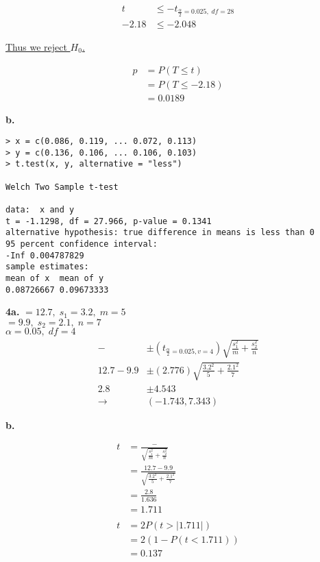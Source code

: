 \documentclass[12pt]{report}
\makeatletter
\newcommand*{\Xbar}{}%
\DeclareRobustCommand*{\Xbar}{%
	\mathpalette\@Xbar{}%
}
\newcommand*{\@Xbar}[2]{%
	\sbox0{$#1\mathrm{X}\m@th$}%
	\sbox2{$#1X\m@th$}%
	\rlap{%
		\hbox to\wd2{%
			\hfill
			$\overline{%
				\vrule width 0pt height\ht0 %
				\kern\wd0 %
			}$%
		}%
	}%
	\copy2 %
}
\newcommand*{\Ybar}{}%
\DeclareRobustCommand*{\Ybar}{%
	\mathpalette\@Ybar{}%
}
\newcommand*{\@Ybar}[2]{%
	\sbox0{$#1\mathrm{Y}\m@th$}%
	\sbox2{$#1Y\m@th$}%
	\rlap{%
		\hbox to\wd2{%
			\hfill
			$\overline{%
				\vrule width 0pt height\ht0 %
				\kern\wd0 %
			}$%
		}%
	}%
	\copy2 %
}
\makeatother
\begin{document}
\begin{align*}
	t &\leq -t_{\frac{\alpha}{2}=0.025,\;df=28} \\
	-2.18 &\leq -2.048
\end{align*}

\noindent \underline{Thus we reject $H_0$.}

\begin{align*}
	p &= P(T \leq t)\\
	&= P(T \leq -2.18)\\
	&= \boxed{0.0189}
\end{align*}


\noindent \textbf{b.}
\begin{verbatim}
> x = c(0.086, 0.119, ... 0.072, 0.113)
> y = c(0.136, 0.106, ... 0.106, 0.103)
> t.test(x, y, alternative = "less")

Welch Two Sample t-test

data:  x and y
t = -1.1298, df = 27.966, p-value = 0.1341
alternative hypothesis: true difference in means is less than 0
95 percent confidence interval:
-Inf 0.004787829
sample estimates:
mean of x  mean of y 
0.08726667 0.09673333 
\end{verbatim}

\noindent \textbf{4a.} $\Xbar = 12.7,\;s_1 = 3.2,\;m=5$\\
$\Ybar = 9.9,\;s_2=2.1,\;n=7$\\

\noindent $\alpha = 0.05,\; df = 4$\\

\begin{align*}
	\Xbar - \Ybar &\pm (t_{\frac{\alpha}{2}=0.025, v=4})\sqrt{\frac{s_1^2}{m} + \frac{s_2^2}{n}}\\
	12.7 - 9.9 &\pm (2.776)\sqrt{\frac{3.2^2}{5} + \frac{2.1^2}{7}}\\
	2.8 &\pm 4.543\\
	\rightarrow & \boxed{(-1.743, 7.343)}
\end{align*}

\pagebreak
\noindent \textbf{b.} 

\begin{align*}
	t &= \frac{\Xbar - \Ybar}{\sqrt{\frac{s_1^2}{m} + \frac{s_2^2}{n}}}\\
	&= \frac{12.7 - 9.9}{\sqrt{\frac{3.2^2}{5} + \frac{2.1^2}{7}}}\\
	&= \frac{2.8}{1.636}\\
	&= \boxed{1.711}\\\\
	t &= 2P(t > |1.711|)\\
	&= 2(1 - P(t < 1.711))\\
	&= \boxed{0.137}
\end{align*}
\end{document}
